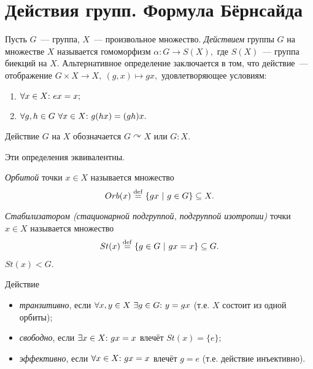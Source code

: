 \newpage
        \section{Действия групп. Формула Бёрнсайда}
        \setcounter{definition}{0}
        \begin{definition}
            Пусть $G$~--- группа, $X$~--- произвольное множество. \textit{Действием} группы $G$ на множестве $X$ называется гомоморфизм ${\alpha : G \rightarrow S(X),}$ где $S(X)$~--- группа биекций на $X$. Альтернативное определение заключается в том, что действие~--- отображение ${G \times X \rightarrow X, \ (g,x) \mapsto gx,}$ удовлетворяющее условиям:
            \begin{enumerate}
                \setlength\itemsep{0.1em}
                \item $\forall x \in X{:}{ } \   ex = x;$
                \item $\forall g,h \in G \ \forall x \in X{:}{ } \  g(hx) = (gh)x.$
            \end{enumerate}
            Действие $G$ на $X$ обозначается $G \curvearrowright X$ или $G : X$.
        \end{definition}
        \begin{remark}
            Эти определения эквивалентны.
        \end{remark}
        \begin{definition}
            \textit{Орбитой} точки ${x \in X}$ называется множество
            \begin{equation*}
                Orb(x) \deq \{gx \ | \ g \in G\} \subseteq X.
            \end{equation*}
        \end{definition}
        \begin{definition}
            \textit{Стабилизатором (стационарной подгруппой, подгруппой изотропии)} точки ${x \in X}$ называется множество
            \begin{equation*}
                St(x) \deq \{g \in G \ | \ gx = x\} \subseteq G.
            \end{equation*}
        \end{definition}
        \begin{remark}
            $St(x) < G.$
        \end{remark}
        \begin{definition}
            Действие
            \begin{itemize}
                \setlength\itemsep{0.1em}
                \item \textit{транзитивно}, если $\forall x,y \in X \ \exists g \in G{:}{ } \  y = gx$ (т.е. $X$ состоит из одной орбиты);
                \item \textit{свободно}, если $\exists x \in X{:}{ } \  gx = x$ влечёт $St(x) = \{e\};$
                \item \textit{эффективно}, если ${\forall x \in X{:}{ } \  gx = x}$ влечёт ${g = e}$ (т.е. действие инъективно).
            \end{itemize}
        \end{definition}
